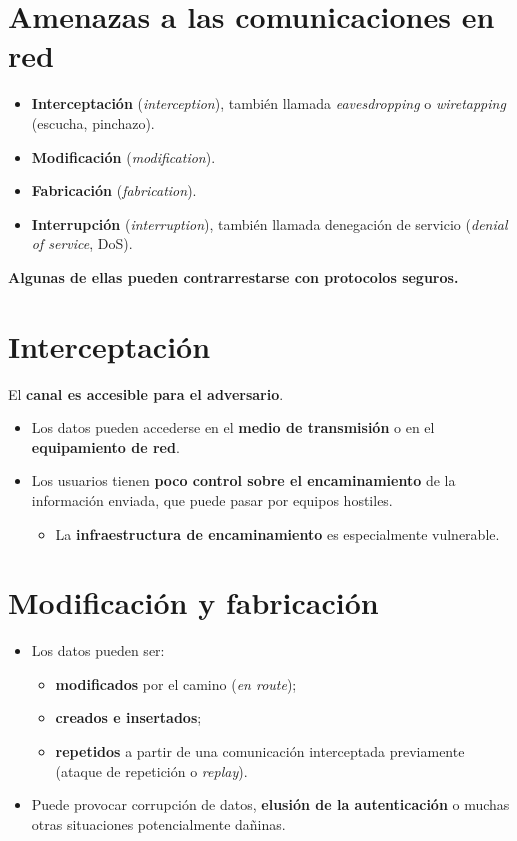 \documentclass[11pt,a4paper]{report}
\begin{document}
\section{Amenazas a las comunicaciones en red}
 
\begin{itemize}
  \item \textbf{Interceptación} (\emph{interception}), también llamada \emph{eavesdropping} o \emph{wiretapping} (escucha, pinchazo).
  \item \textbf{Modificación} (\emph{modification}).
  \item \textbf{Fabricación} (\emph{fabrication}).
  \item \textbf{Interrupción} (\emph{interruption}), también llamada denegación de servicio (\emph{denial of service}, DoS).
\end{itemize}
 
\textbf{Algunas de ellas pueden contrarrestarse con protocolos seguros.}
 
\section{Interceptación}
 
\begin{importante}[title={Idea clave}]
El \textbf{canal es accesible para el adversario}.
\end{importante}
 
\begin{itemize}
  \item Los datos pueden accederse en el \textbf{medio de transmisión} o en el \textbf{equipamiento de red}.
  \item Los usuarios tienen \textbf{poco control sobre el encaminamiento} de la información enviada, que puede pasar por equipos hostiles.
    \begin{itemize}
      \item La \textbf{infraestructura de encaminamiento} es especialmente vulnerable.
    \end{itemize}
\end{itemize}
 
\section{Modificación y fabricación}
 
\begin{itemize}
  \item Los datos pueden ser:
    \begin{itemize}
      \item \textbf{modificados} por el camino (\emph{en route});
      \item \textbf{creados e insertados};
      \item \textbf{repetidos} a partir de una comunicación interceptada previamente (ataque de repetición o \emph{replay}).
    \end{itemize}
  \item Puede provocar corrupción de datos, \textbf{elusión de la autenticación} o muchas otras situaciones potencialmente dañinas.
\end{itemize}
 
\end{document}
